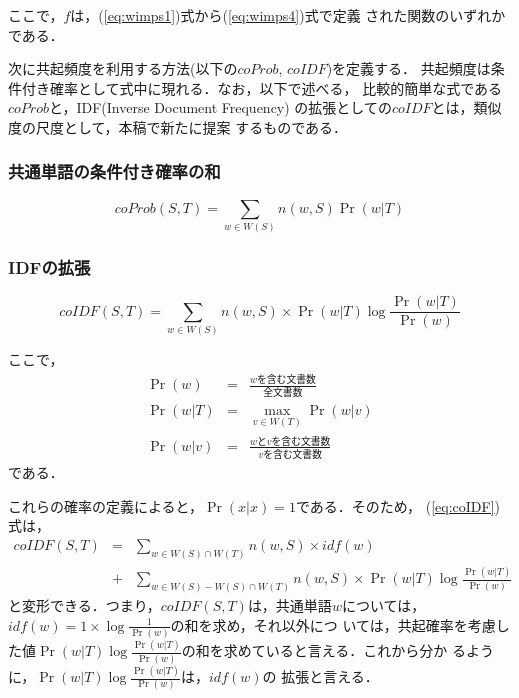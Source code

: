 ここで，$f$は，(\ref{eq:wimps1})式から(\ref{eq:wimps4})式で定義
された関数のいずれかである．

次に共起頻度を利用する方法(以下の$coProb$, $coIDF$)を定義する．
共起頻度は条件付き確率として式中に現れる．なお，以下で述べる，
比較的簡単な式である$coProb$と，IDF(Inverse Document Frequency)
の拡張としての$coIDF$とは，類似度の尺度として，本稿で新たに提案
するものである．

\subsubsection*{共通単語の条件付き確率の和}

\begin{equation}
  \label{eq:coProb}
  coProb(S,T) = \sum_{w \in W(S)} n(w,S) \Pr(w|T)
\end{equation}

\subsubsection*{IDFの拡張}

\begin{equation}
  \label{eq:coIDF}
  coIDF(S,T) = \sum_{w \in W(S)} n(w,S) \times \Pr(w|T) \log \frac{\Pr(w|T)}{\Pr(w)}
\end{equation}

ここで，
\begin{eqnarray}
  \label{eq:pr1}
  \Pr(w) & = & \frac{\mbox{$w$を含む文書数}}{\mbox{全文書数}}\\
  \label{eq:pr2}
  \Pr(w|T) & = & \max_{v \in W(T)} \Pr(w|v)\\
  \label{eq:pr3}
  \Pr(w|v) & = & \frac{\mbox{$w$と$v$を含む文書数}}{\mbox{$v$を含む文書数}}
\end{eqnarray}
である．

これらの確率の定義によると，$\Pr(x|x) = 1$である．そのため，
(\ref{eq:coIDF})式は，
\begin{eqnarray}
  coIDF(S,T) & = & \sum_{w \in W(S) \cap W(T)} n(w,S) \times idf(w) \nonumber \\
  & + & \sum_{w \in W(S) - W(S) \cap W(T)} n(w,S) \times \Pr(w|T) \log \frac{\Pr(w|T)}{\Pr(w)} \nonumber
\end{eqnarray}
と変形できる．つまり，$coIDF(S,T)$は，共通単語$w$については，
$idf(w)=1\times \log \frac{1}{\Pr(w)}$の和を求め，それ以外につ
いては，共起確率を考慮した値$\Pr(w|T) \log
\frac{\Pr(w|T)}{\Pr(w)}$の和を求めていると言える．これから分か
るように，$\Pr(w|T) \log \frac{\Pr(w|T)}{\Pr(w)}$は，$idf(w)$の
拡張と言える．

